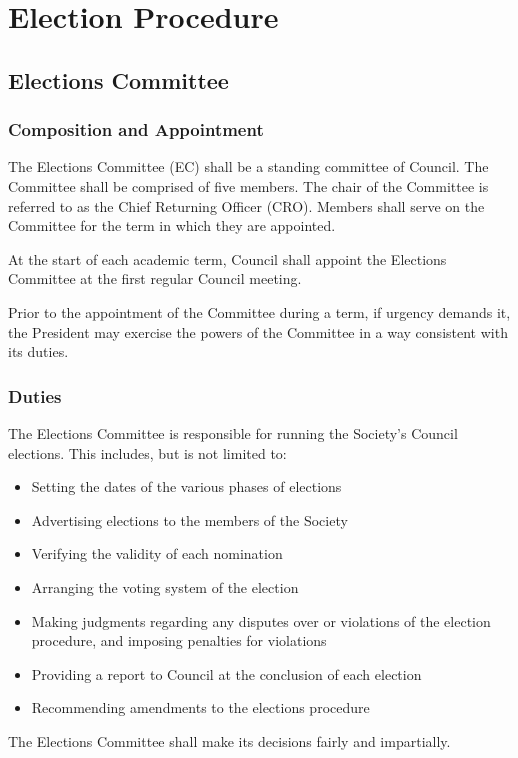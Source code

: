 \section{Election Procedure}
\newcommand{\votewebsite}{\href{https://vote.wusa.ca}{vote.wusa.ca}}
\subsection{Elections Committee}
\subsubsection{Composition and Appointment}
The Elections Committee (EC) shall be a standing committee of Council.
The Committee shall be comprised of five members.
The chair of the Committee is referred to as the Chief Returning Officer (CRO).
Members shall serve on the Committee for the term in which they are appointed.

At the start of each academic term, Council shall appoint the Elections Committee at the first regular Council meeting.

Prior to the appointment of the Committee during a term, if urgency demands it, the President may exercise the powers of the Committee in a way consistent with its duties.

\subsubsection{Duties}
The Elections Committee is responsible for running the Society's Council elections.
This includes, but is not limited to:
\begin{itemize}
	\item Setting the dates of the various phases of elections
	\item Advertising elections to the members of the Society
	\item Verifying the validity of each nomination
	\item Arranging the voting system of the election
	\item Making judgments regarding any disputes over or violations of the election procedure, and imposing penalties for violations
	\item Providing a report to Council at the conclusion of each election
	\item Recommending amendments to the elections procedure
\end{itemize}

The Elections Committee shall make its decisions fairly and impartially.
